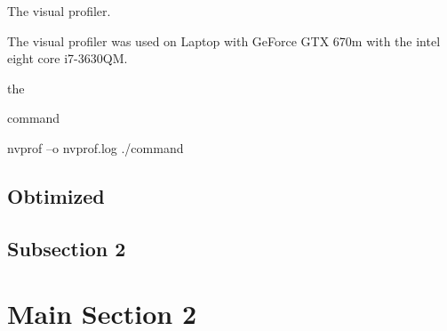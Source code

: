 The visual profiler.

The visual profiler was used on Laptop with GeForce GTX 670m with the intel eight core i7-3630QM.


the

command

 nvprof –o nvprof.log ./command


\subsection{Obtimized}



\subsection{Subsection 2}


\section{Main Section 2}
